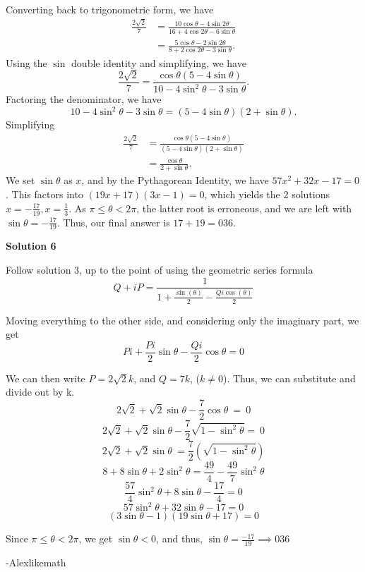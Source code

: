 \begin{enumerate}
 Converting back to trigonometric form, we have 
 \begin{align*}\frac{2\sqrt{2}}{7}&=\frac{10\cos{\theta}-4\sin{2\theta}}{16+4\cos{2\theta}-6\sin{\theta}}\\ &=\frac{5\cos{\theta}-2\sin{2\theta}}{8+2\cos{2\theta}-3\sin{\theta}}.\end{align*}
 Using the $\sin$ double identity and simplifying, we have 
 \[\frac{2\sqrt2}{7}=\frac{\cos{\theta}(5-4\sin{\theta})}{10-4\sin^2{\theta}-3\sin{\theta}}.\] Factoring the denominator, we have 
 \[10-4\sin^2{\theta}-3\sin{\theta}=(5-4\sin\theta)(2+\sin\theta).\] Simplifying 
 \begin{align*}\frac{2\sqrt2}{7}&= \frac{\cos{\theta}(5-4\sin{\theta})}{(5-4\sin\theta)(2+\sin\theta)}\\ &=\frac{\cos\theta}{2+\sin\theta}.\end{align*}
 We set $\sin\theta$ as $x$, and by the Pythagorean Identity, we have $57x^2+32x-17=0$. This factors into $(19x+17)(3x-1)=0$, which yields the 2 solutions $x=-\frac{17}{19}, x=\frac{1}{3}$. As $\pi\leq\theta<2\pi$, the latter root is erroneous, and we are left with $\sin\theta=-\frac{17}{19}$. Thus, our final answer is $17+19=\boxed{036}$.

 



\textbf{Solution 6}

Follow solution 3, up to the point of using the geometric series formula
 \[Q+iP=\frac{1}{1+\frac{\sin(\theta)}{2}-\frac{Qi\cos(\theta)}{2}}\]

 Moving everything to the other side, and considering only the imaginary part, we get
 \[Pi+\frac{Pi}{2}\sin\theta-\frac{Qi}{2}\cos\theta = 0\]

 We can then write $P = 2 \sqrt{2} k$, and $Q = 7k$, ($k \neq 0$). Thus, we can substitute and divide out by k.
 \[2\sqrt{2}+\sqrt{2}\sin\theta-\frac{7}{2}\cos\theta\ =\ 0\]
 \[2\sqrt{2}+\sqrt{2}\sin\theta-\frac{7}{2}\sqrt{1-\sin^{2}\theta}=\ 0\]
 \[2\sqrt{2}+\sqrt{2}\sin\theta\ =\frac{7}{2}\left(\sqrt{1-\sin^{2}\theta}\right)\]
 \[8+8\sin\theta+2\sin^{2}\theta=\frac{49}{4}-\frac{49}{7}\sin^{2}\theta\]
 \[\frac{57}{4}\sin^{2}\theta+8\sin\theta-\frac{17}{4} = 0\]
 \[57\sin^{2}\theta+32\sin\theta-17 = 0\]
 \[\left(3\sin\theta-1\right)\left(19\sin\theta+17\right) = 0\]

 Since $\pi \le \theta < 2\pi$, we get $\sin \theta < 0$, and thus, $\sin\theta = \frac{-17}{19} \implies \boxed{036}$

 -Alexlikemath


\end{enumerate}
